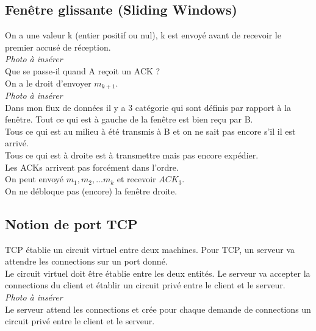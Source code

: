 \documentclass{article}
\begin{document}
\subsection{Fenêtre glissante (Sliding Windows)}
On a une valeur k (entier positif ou nul), k est envoyé avant de recevoir le premier accusé de réception. \\
\emph{Photo à insérer} \\
Que se passe-il quand A reçoit un ACK ? \\
On a le droit d'envoyer $m_{k+1}$.
\\ \emph{Photo à insérer} \\
Dans mon flux de données il y a 3 catégorie qui sont définis par rapport à la fenêtre.
Tout ce qui est à gauche de la fenêtre est bien reçu par B. \\
Tous ce qui est au milieu à été transmis à B et on ne sait pas encore s'il il est arrivé. \\
Tous ce qui est à droite est à transmettre mais pas encore expédier. \\
Les ACKs arrivent pas forcément dans l'ordre. \\
On peut envoyé $m_1,m_2,...m_k$ et recevoir $ACK_3$. \\
On ne débloque pas (encore) la fenêtre droite.
\subsection{Notion de port TCP}
TCP établie un circuit virtuel entre deux machines. Pour TCP, un serveur va attendre les connections sur un port donné. \\
Le circuit virtuel doit être établie entre les deux entités. Le serveur va accepter la connections du client et établir un circuit privé entre le client et le serveur.
\\ \emph{Photo à insérer} \\
Le serveur attend les connections et crée pour chaque demande de connections un circuit privé entre le client et le serveur. \\
\end{document}
